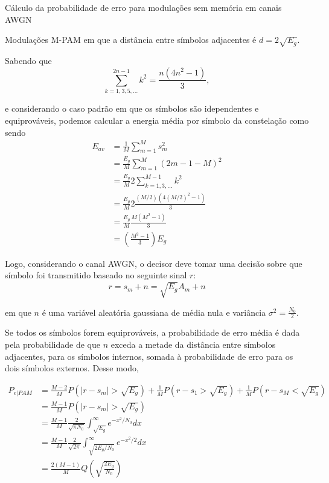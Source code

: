 \documentclass[
  ignorenonframetext,
]{beamer}
\begin{document}
\begin{frame}{Cálculo da probabilidade de erro para modulações sem
memória em canais AWGN}
\begin{block}{Modulações M-PAM}
em que a distância entre símbolos adjacentes é \(d=2\sqrt{E_g}\).

Sabendo que \[
\sum_{k=1,3,5,...}^{2n-1} k^2=\frac{n(4n^2-1)}{3},
\]

e considerando o caso padrão em que os símbolos são idependentes e
equiprováveis, podemos calcular a energia média por símbolo da
constelação como sendo \[
\begin{align}
E_{a v} & =\frac{1}{M} \sum_{m=1}^M s_m^2 \nonumber \\
& =\frac{E_g}{M} \sum_{m=1}^M(2 m-1-M)^2 \nonumber  \\
& =\frac{E_g}{M} 2\sum_{k=1,3,...}^{M-1}k^2 \nonumber  \\
& =\frac{E_g}{M} 2\frac{(M/2)\left(4(M/2)^2-1\right)}{3} \nonumber \\
& =\frac{E_g}{M} \frac{M\left(M^2-1\right)}{3} \nonumber \\
& =\left(\frac{M^2-1}{3}\right) E_g
\end{align}
\]

Logo, considerando o canal AWGN, o decisor deve tomar uma decisão sobre
que símbolo foi transmitido baseado no seguinte sinal \(r\): \begin{equation}
r=s_m+n=\sqrt{E_g} A_m + n
\end{equation}

em que \(n\) é uma variável aleatória gaussiana de média nula e
variância \(\sigma^2 = \frac{N_0}{2}\).

Se todos os símbolos forem equiprováveis, a probabilidade de erro média
é dada pela probabilidade de que \(n\) exceda a metade da distância
entre símbolos adjacentes, para os símbolos internos, somada à
probabilidade de erro para os dois símbolos externos. Desse modo,

\[
\begin{align}
P_{e|PAM} & =\frac{M-2}{M} P\left(\left|r-s_m\right|>\sqrt{E_g}\right) + \frac{1}{M} P\left(r-s_1>\sqrt{E_g}\right) + \frac{1}{M} P\left(r-s_M<\sqrt{E_g}\right)\nonumber \\
& =\frac{M-1}{M} P\left(\left|r-s_m\right|>\sqrt{E_g}\right)\nonumber  \\
& =\frac{M-1}{M} \frac{2}{\sqrt{\pi N_0}} \int_{\sqrt{E_g}}^{\infty} e^{-x^2 / N_0} d x \nonumber \\
& =\frac{M-1}{M} \frac{2}{\sqrt{2 \pi}} \int_{\sqrt{2 E_g / N_0}}^{\infty} e^{-x^2 / 2} d x\nonumber  \\
& =\frac{2(M-1)}{M} Q\left(\sqrt{\frac{2 E_g}{N_0}}\right)
\end{align}
\]


\end{block}
\end{frame}
\end{document}
